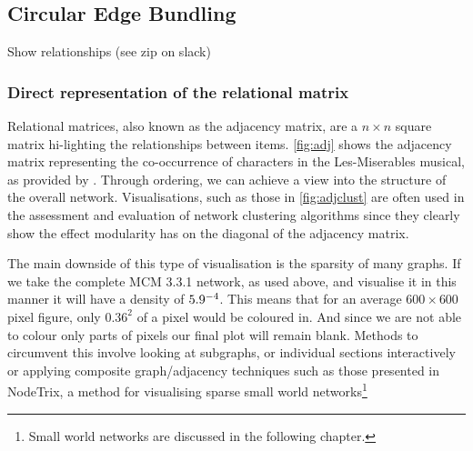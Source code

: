 \subsection{Circular Edge Bundling}

Show relationships (see zip on slack)






\subsubsection{Direct representation of the relational matrix}
Relational matrices, also known as the adjacency matrix, are a $n \times n$ square matrix hi-lighting the relationships between items. \autoref{fig:adj} shows the adjacency matrix representing the co-occurrence of characters in the Les-Miserables musical, as provided by \cite{lesmis}. Through ordering, we can achieve a view into the structure of the overall network. Visualisations, such as those in \autoref{fig:adjclust} are often used in the assessment and evaluation of network clustering algorithms since they clearly show the effect modularity has on the diagonal of the adjacency matrix. 


The main downside of this type of visualisation is the sparsity of many graphs. If we take the complete MCM 3.3.1 network, as used above, and visualise it in this manner it will have a density of $5.9 \time 10^{-4}$. This means that for an average $600 \times 600$ pixel figure, only $0.36^2$ of a pixel would be coloured in. And since we are not able to colour only parts of pixels our final plot will remain blank. Methods to circumvent this involve looking at subgraphs, or individual sections interactively or applying composite graph/adjacency techniques such as those presented in NodeTrix, a method for visualising sparse small world networks\footnote{Small world networks are discussed in the following chapter.} \cite{nodetrix}

